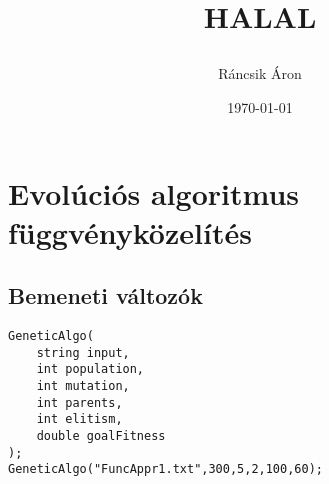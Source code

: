 \documentclass[12pt,a4paper,oneside]{report}
\title{%
\vfill
\large \textbf{HALAL}
\vfill
\author{Ráncsik Áron}
\date{\today}
}
\begin{document}
\maketitle
\noindent

\chapter*{Evolúciós algoritmus függvényközelítés}

\section*{Bemeneti változók}

\begin{lstlisting}
GeneticAlgo(
	string input, 
	int population, 
	int mutation, 
	int parents,
	int elitism, 
	double goalFitness
);
GeneticAlgo("FuncAppr1.txt",300,5,2,100,60);
\end{lstlisting}
\end{document}
